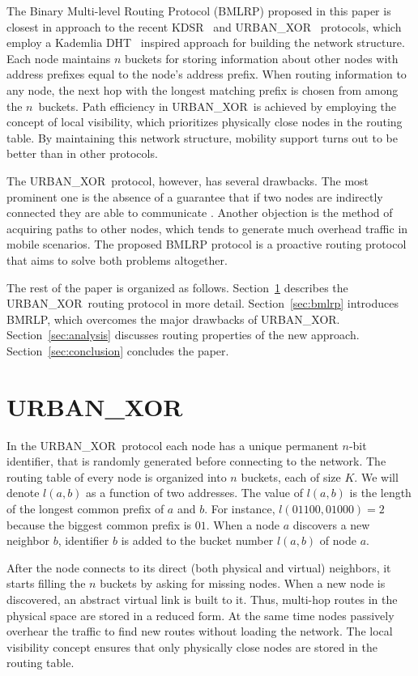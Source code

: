 \documentclass[conference]{IEEEtran}
\theoremstyle{definition}
\newcommand{\urbanxor}{URBAN\_XOR}
\begin{document}
The Binary Multi-level Routing Protocol (BMLRP) proposed in this paper is closest in approach to the recent KDSR~\cite{kdsr} and \urbanxor~\cite{Pasquini} protocols, which employ a Kademlia DHT~\cite{kademlia} inspired approach for building the network structure. Each node maintains $n$ buckets for storing information about other nodes with address prefixes equal to the node's address prefix. When routing information to any node, the next hop with the longest matching prefix is chosen from among the $n$~buckets. Path efficiency 
in \urbanxor~is achieved by employing the concept of local visibility, which prioritizes physically close nodes in the routing table. By maintaining this network structure, mobility support turns out to be better than in other protocols.

The \urbanxor\ protocol, however, has several drawbacks. The most prominent one is the absence of a guarantee that if two nodes are indirectly connected they are able to communicate \cite{Pasquini}. Another objection is the method of acquiring paths to other nodes, which tends to generate much overhead traffic in mobile scenarios. The proposed BMLRP protocol is a proactive routing protocol that aims to solve both problems altogether.

The rest of the paper is organized as follows. Section~\ref{sec:urbanxor} describes the \urbanxor\ routing protocol in more detail. Section~\ref{sec:bmlrp} introduces BMRLP, which overcomes the major drawbacks of \urbanxor. 
Section~\ref{sec:analysis} discusses routing properties of the new approach. 
Section~\ref{sec:conclusion} concludes the paper.


\section{\urbanxor}
\label{sec:urbanxor}

In the \urbanxor\ protocol each node has a unique permanent $n$-bit identifier, that is randomly generated before connecting to the network. The routing table of every node is organized into $n$ buckets, each of size $K$. We will denote $l(a,b)$ as a function of two addresses. The value of $l(a,b)$ is the length of the longest common prefix of $a$ and $b$. For instance, $l(01100, 01000) = 2$ because the biggest common prefix is $01$. When a node $a$ discovers a new neighbor $b$, identifier $b$ is added to the bucket number $l(a,b)$ of node $a$.

After the node connects to its direct (both physical and virtual) neighbors, it starts filling the $n$ buckets by asking for missing nodes. When a new node is discovered, an abstract virtual link is built to it. Thus, multi-hop routes in the physical space are stored in a reduced form. At the same time nodes passively overhear the traffic to find new routes without loading the network. The local visibility concept ensures that only physically close nodes are stored in the routing table.
\end{document}
